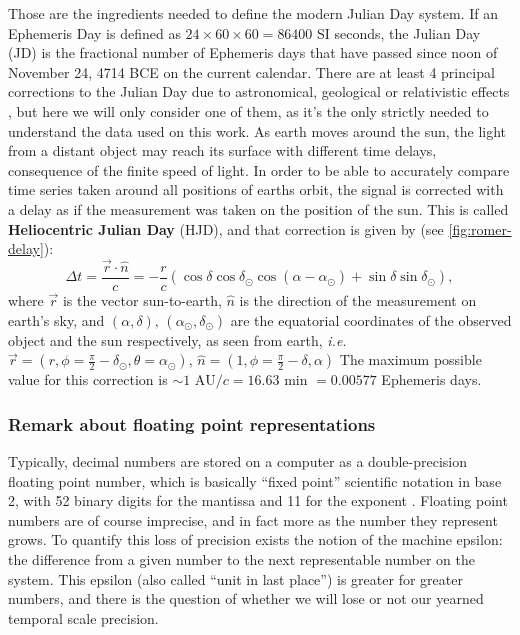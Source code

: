 	Those are the ingredients needed to define the modern Julian Day system. If an Ephemeris Day is defined as $24\times60\times60=86400$ SI seconds, 
	the Julian Day (JD) is the fractional number of Ephemeris days that have passed since noon of November 24, 4714 BCE on the current calendar. 
	There are at least 4 principal corrections to the Julian Day due to astronomical, geological or relativistic effects \citep{Eastman2010}, 
	but here we will only consider one of them, as it's the only strictly needed to understand the data used on this work.
	As earth moves around the sun, the light from a distant object may reach its surface with different time delays, consequence of the finite speed of light.
	In order to be able to accurately compare time series taken around all positions of earths orbit, 
	the signal is corrected with a delay as if the measurement was taken on the position of the sun.
	This is called \textbf{Heliocentric Julian Day} (HJD), and that correction is given by (see \autoref{fig:romer-delay}):
	\begin{equation}
		\Delta t = \frac{\vec{r}\cdot \hat{n}}{c} = - \frac{r}{c} \left(\cos\delta \cos \delta_{\odot}\cos(\alpha-\alpha_\odot)+ \sin\delta \sin \delta_\odot\right),
	\end{equation}
	where $\vec{r}$ is the vector sun-to-earth, $\hat{n}$ is the direction of the measurement on earth's sky, 
	and $(\alpha,\delta),\,(\alpha_\odot,\delta_\odot)$ are the equatorial coordinates of the observed object and the sun respectively, 
	as seen from earth, \textit{i.e.} $\vec{r} = (r,\phi=\frac\pi2-\delta_\odot,\theta=\alpha_\odot)$, $\hat n = (1,\phi=\frac\pi2-\delta,\alpha)$ 
	The maximum possible value for this correction is $\sim 1 \text{ AU}/c = 16.63 \text{ min } = 0.00577$ Ephemeris days.
	
	\subsubsection{Remark about floating point representations}
	
	
	Typically, decimal numbers are stored on a computer as a double-precision floating point number, 
	which is basically \enquote{fixed point} scientific notation in base 2, with 52 binary digits for the mantissa and 11 for the exponent \citep{IEEE2019}.
	Floating point numbers are of course imprecise, and in fact more as the number they represent grows. 
	To quantify this loss of precision exists the notion of the machine epsilon: 
	the difference from a given number to the next representable number on the system.
	This epsilon (also called \enquote{unit in last place}) is greater for greater numbers,
	and there is the question of whether we will lose or not our yearned temporal scale precision.
	
